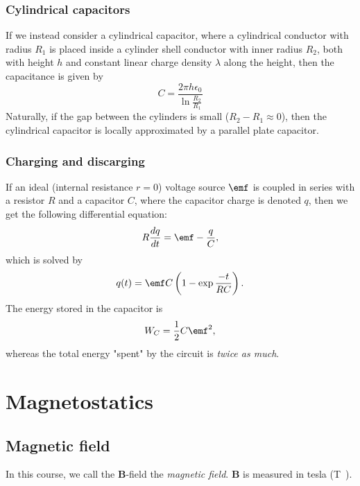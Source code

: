\documentclass[a4paper, 12pt]{article}
\renewcommand{\vec}[1]{\mathbf{#1}}
\newcommand{\e}{\ensuremath{\epsilon_0}}
\newcommand{\B}{\ensuremath{\vec{B}}}
\begin{document}
    \subsubsection{Cylindrical capacitors}
        If we instead consider a cylindrical capacitor, 
        where a cylindrical conductor with radius $R_1$ is placed inside a cylinder shell conductor with inner radius $R_2$, 
        both with height $h$ and constant linear charge density $\lambda$ along the height, then the capacitance is given by 
        \begin{equation}
            C = \frac{2\pi h \e}{\ln{\frac{R_2}{R_1}}}
        \end{equation}
        Naturally, if the gap between the cylinders is small ($R_2 - R_1 \approx 0$), 
        then the cylindrical capacitor is locally approximated by a parallel plate capacitor.

    \subsubsection{Charging and discarging}
        If an ideal (internal resistance $r=0$) voltage source $\emf$ is coupled in series with a resistor $R$ 
        and a capacitor $C$, where the capacitor charge is denoted $q$, then we get the following differential equation: 
        \begin{equation}
            R\frac{dq}{dt} = \emf - \frac{q}{C},
        \end{equation}
        which is solved by
        \begin{equation}
            q(t) = \emf C \left(1-\exp{\frac{-t}{RC}}\right).
        \end{equation}
        The energy stored in the capacitor is 
        \begin{equation}
            W_C = \frac{1}{2}C\emf^2,
        \end{equation}
        whereas the total energy "spent" by the circuit is \textit{twice as much}.

\section{Magnetostatics}
    \subsection{Magnetic field}
        In this course, we call the \B-field the \textit{magnetic field}. \B{} is measured in tesla (\si\tesla).
        
\end{document}
